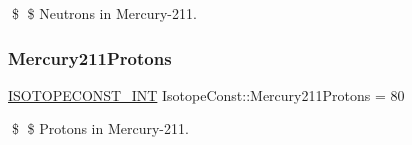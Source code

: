 \$ \$ Neutrons in Mercury-\/211. \mbox{\label{group___isotope_const-_mercury-_hg211_ga94698216f4c1d347737ac8ff7d3c570c}} 
\subsubsection{\texorpdfstring{Mercury211\+Protons}{Mercury211Protons}}
{\footnotesize\ttfamily \mbox{\hyperlink{group___isotope_const-_macros_ga5f18360b3e99483a35c32d789e62621c}{I\+S\+O\+T\+O\+P\+E\+C\+O\+N\+S\+T\+\_\+\+I\+NT}} Isotope\+Const\+::\+Mercury211\+Protons = 80}

\$ \$ Protons in Mercury-\/211. 